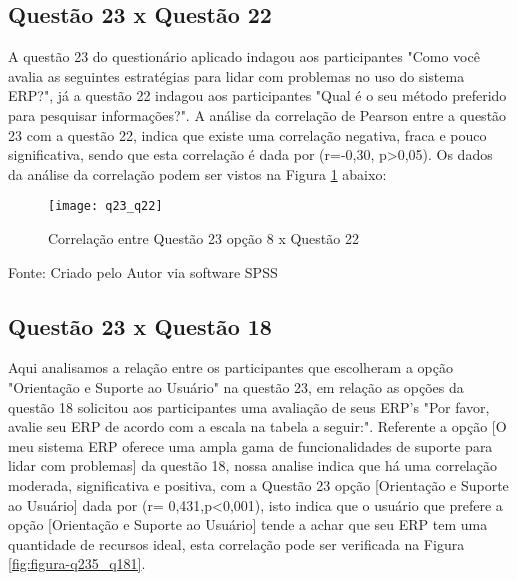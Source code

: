 \subsection{Questão 23 x Questão 22}

A questão 23 do questionário aplicado indagou aos participantes "Como você avalia as seguintes estratégias para lidar com problemas no uso do sistema ERP?", já a questão 22 indagou aos participantes "Qual é o seu método preferido para pesquisar informações?".\newline
\indent A análise da correlação de Pearson entre a questão 23 com a questão 22, indica que existe uma correlação negativa, fraca e pouco significativa, sendo que esta correlação é  dada por (r=-0,30, p>0,05).\newline
\indent Os dados da  análise da correlação podem ser vistos na Figura \ref{fig:figura-q23_q22}  abaixo:

\begin{figure}[H]
	\centering	
	\caption{Correlação entre Questão 23 opção 8 x Questão 22}
	\texttt{[image: q23\_q22]}
	\label{fig:figura-q23_q22}
\end{figure}
\vspace{-0.8 cm} \hspace{2.15 cm} Fonte: Criado pelo Autor via software SPSS\newline

\subsection{Questão 23 x Questão 18}

Aqui analisamos a relação entre os participantes que escolheram a opção "Orientação e Suporte ao Usuário" na questão 23, em relação as opções da questão 18 solicitou aos participantes uma avaliação de seus ERP's "Por favor, avalie seu ERP de acordo com a escala na tabela a seguir:".\newline
\indent Referente a opção [O meu sistema ERP oferece uma ampla gama de funcionalidades de suporte para lidar com problemas] da questão 18, nossa analise indica que há uma correlação moderada, significativa e positiva, com a Questão 23 opção [Orientação e Suporte ao Usuário] dada por (r= 0,431,p<0,001), isto indica que o usuário que prefere a opção [Orientação e Suporte ao Usuário] tende a achar que seu ERP tem uma quantidade de recursos ideal, esta correlação pode ser verificada na Figura \ref{fig:figura-q235_q181}.\newline

